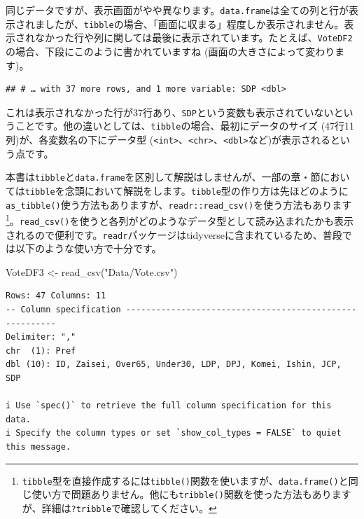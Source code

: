\documentclass[
  a4paper,
  pandoc,
  ja=standard,
  jafont=haranoaji]{bxjsbook}
\newenvironment{Shaded}{\begin{snugshade}}{\end{snugshade}}
\newcommand{\FunctionTok}[1]{\textcolor[rgb]{0.28,0.35,0.67}{#1}}
\newcommand{\NormalTok}[1]{\textcolor[rgb]{0.00,0.48,0.65}{#1}}
\newcommand{\OtherTok}[1]{\textcolor[rgb]{0.00,0.48,0.65}{#1}}
\newcommand{\StringTok}[1]{\textcolor[rgb]{0.13,0.47,0.30}{#1}}
\begin{document}
同じデータですが、表示画面がやや異なります。\texttt{data.frame}は全ての列と行が表示されましたが、\texttt{tibble}の場合、「画面に収まる」程度しか表示されません。表示されなかった行や列に関しては最後に表示されています。たとえば、\texttt{VoteDF2}の場合、下段にこのように書かれていますね
(画面の大きさによって変わります)。

\begin{verbatim}
## # … with 37 more rows, and 1 more variable: SDP <dbl>
\end{verbatim}

これは表示されなかった行が37行あり、\texttt{SDP}という変数も表示されていないということです。他の違いとしては、\texttt{tibble}の場合、最初にデータのサイズ
(47行11列)が、各変数名の下にデータ型
(\texttt{\textless{}int\textgreater{}}、\texttt{\textless{}chr\textgreater{}}、\texttt{\textless{}dbl\textgreater{}}など)が表示されるという点です。

本書は\texttt{tibble}と\texttt{data.frame}を区別して解説はしませんが、一部の章・節においては\texttt{tibble}を念頭において解説をします。\texttt{tibble}型の作り方は先ほどのように\texttt{as\_tibble()}使う方法もありますが、\texttt{readr::read\_csv()}を使う方法もあります\footnote{\texttt{tibble}型を直接作成するには\texttt{tibble()}関数を使いますが、\texttt{data.frame()}と同じ使い方で問題ありません。他にも\texttt{tribble()}関数を使った方法もありますが、詳細は\texttt{?tribble}で確認してください。}。\texttt{read\_csv()}を使うと各列がどのようなデータ型として読み込まれたかも表示されるので便利です。\texttt{readr}パッケージはtidyverseに含まれているため、普段では以下のような使い方で十分です。

\begin{Shaded}
\begin{Highlighting}[numbers=left,,]
\NormalTok{VoteDF3 }\OtherTok{\textless{}{-}} \FunctionTok{read\_csv}\NormalTok{(}\StringTok{"Data/Vote.csv"}\NormalTok{)}
\end{Highlighting}
\end{Shaded}

\begin{verbatim}
Rows: 47 Columns: 11
-- Column specification --------------------------------------------------------
Delimiter: ","
chr  (1): Pref
dbl (10): ID, Zaisei, Over65, Under30, LDP, DPJ, Komei, Ishin, JCP, SDP

i Use `spec()` to retrieve the full column specification for this data.
i Specify the column types or set `show_col_types = FALSE` to quiet this message.
\end{verbatim}
\end{document}
